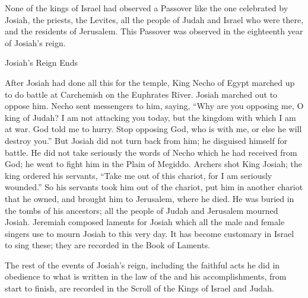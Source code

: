 {None
of the kings
of Israel
had observed
a Passover
like the one celebrated
by Josiah,
the priests,
the Levites,
all
the people of Judah
and Israel
who were
there, and the residents
of Jerusalem.
This
Passover
was observed
in the eighteenth
year
of Josiah’s
reign.
\par }{\SH Josiah’s Reign Ends
\par }{\PP {}After
Josiah
had done
all
this
for the temple,
King
Necho
of Egypt
marched up
to do battle at Carchemish
on
the Euphrates
River. Josiah
marched
out
to oppose him.
Necho sent
messengers
to
him, saying,
“Why
are you opposing me, O king
of Judah? I am not
attacking you
today,
but
the kingdom
with which I am at war.
God
told
me to hurry.
Stop
opposing God,
who
is with
me, or else he will destroy you.”
But Josiah
did not
turn
back from
him; he disguised
himself for
battle.
He did not
take seriously
the words
of Necho
which he had received from God;
he went
to fight
him in the Plain
of Megiddo.
Archers
shot
King
Josiah;
the king
ordered
his servants,
“Take me out of this chariot, for
I am seriously
wounded.”
So
his servants
took
him out
of
the chariot,
put him in
another chariot
that
he owned,
and brought
him to Jerusalem,
where he died.
He was buried
in the tombs
of his ancestors;
all
the people of Judah
and Jerusalem
mourned
Josiah.
Jeremiah
composed
laments
for Josiah
which all
the male
and female singers
use to mourn
Josiah
to this very
day.
It
has become customary
in Israel
to sing these; they are recorded
in the Book of Laments.
\par }{\PP {}The rest
of the events
of Josiah’s
reign, including the faithful
acts he did in obedience to what is written
in the law
of the {}
and his accomplishments,
from start
to finish,
are recorded
in the Scroll
of the Kings
of Israel
and Judah.

}
